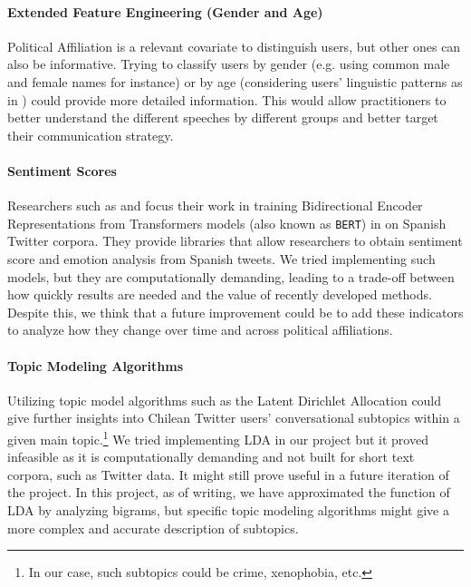         
        \paragraph{Extended Feature Engineering (Gender and Age)} Political Affiliation is a relevant covariate to distinguish users, but other ones can also be informative. Trying to classify users by gender (e.g. using common male and female names for instance) %
        or by age (considering users' linguistic patterns as in \cite{rao2010classifying}) could provide more detailed information. This would allow practitioners to better understand the different speeches by different groups and better target their communication strategy. 
        
        
        \paragraph{Sentiment Scores} Researchers such as \cite{perez2021robertuito} and \cite{gonzalez2021twilbert} focus their work in training Bidirectional Encoder Representations from Transformers models  (also known as \texttt{BERT}) in  \cite{devlin2018bert} on Spanish Twitter corpora. They provide libraries that allow researchers to obtain sentiment score and emotion analysis from Spanish tweets. We tried implementing such models, but they are computationally demanding, leading to a trade-off between how quickly results are needed and the value of recently developed methods. Despite this, we think that a future improvement could be to add these indicators to analyze how they change over time and across political affiliations. 
        
        
        \paragraph{Topic Modeling Algorithms} Utilizing topic model algorithms such as the Latent Dirichlet Allocation \citep{blei2003latent} could give further insights into Chilean Twitter users' conversational subtopics within a given main topic.\footnote{In our case, such subtopics could be crime, xenophobia, etc.} We tried implementing LDA in our project but it proved infeasible as it is computationally demanding and not built for short text corpora, such as Twitter data. It might still prove useful in a future iteration of the project. In this project, as of writing, we have approximated the function of LDA by analyzing bigrams, but specific topic modeling algorithms might give a more complex and accurate description of subtopics.
    
    
    